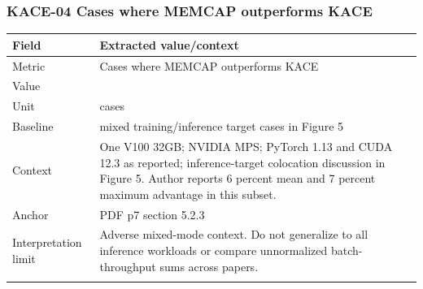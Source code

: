 \subsubsection*{KACE-04 Cases where MEMCAP outperforms KACE}
\begin{longtable}{>{\raggedright\arraybackslash}p{}>{\raggedright\arraybackslash}p{}}
\toprule
\textbf{Field} & \textbf{Extracted value/context}\\\midrule\endhead
Metric & Cases where MEMCAP outperforms KACE\\\addlinespace
Value & 2\\\addlinespace
Unit & cases\\\addlinespace
Baseline & 21 mixed training/inference target cases in Figure 5\\\addlinespace
Context & One V100 32GB;\allowbreak{} NVIDIA MPS;\allowbreak{} PyTorch 1.13 and CUDA 12.3 as reported;\allowbreak{} inference-target colocation discussion in Figure 5. Author reports 6 percent mean and 7 percent maximum advantage in this subset.\\\addlinespace
Anchor & PDF p7 section 5.2.3\\\addlinespace
Interpretation limit & Adverse mixed-mode context. Do not generalize to all inference workloads or compare unnormalized batch-throughput sums across papers.\\\addlinespace
\bottomrule\end{longtable}
